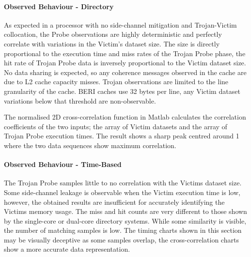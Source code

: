 				\paragraph{Observed Behaviour - Directory}
					As expected in a processor with no side-channel mitigation and Trojan-Victim collocation, the Probe observations are highly deterministic and perfectly correlate with variations in the Victim's dataset size. 
					The size is directly proportional to the execution time and miss rates of the Trojan Probe phase, the hit rate of Trojan Probe data is inversely proportional to the Victim dataset size. 
					No data sharing is expected, so any coherence messages observed in the cache are due to L2 cache capacity misses. Trojan observations are limited to the line granularity of the cache. BERI caches use 32 bytes per line, any Victim dataset variations below that threshold are non-observable.
					
					The normalised 2D cross-correlation function in Matlab calculates the correlation coefficients of the two inputs; the array of Victim datasets and the array of Trojan Probe execution times. The result shows a sharp peak centred around 1 where the two data sequences show maximum correlation.
				
				\paragraph{Observed Behaviour - Time-Based}
					
					The Trojan Probe samples little to no correlation with the Victims dataset size. Some side-channel leakage is observable when the Victim execution time is low, however, the obtained results are insufficient for accurately identifying the Victims memory usage. The miss and hit counts are very different to those shown by the single-core or dual-core directory systems. While some similarity is visible, the number of matching samples is low. The timing charts shown in this section may be visually deceptive as some samples overlap, the cross-correlation charts show a more accurate data representation.
				
